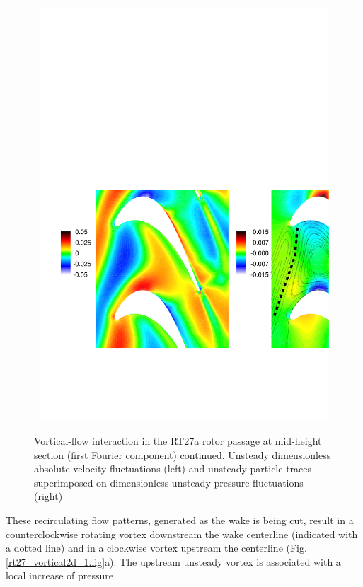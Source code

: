\begin{figure}
\begin{center}
\begin{tabular}{c}
{        \includegraphics[width=130mm,clip=t]{CHAP_RT27/FIGURE/unsmidsec_3.pdf}}
   \end{tabular}
  \end{center}
  \vspace{-8mm}
  \caption{Vortical-flow interaction in the RT27a rotor passage at
           mid-height section (first Fourier component) continued.
           Unsteady dimensionless
           absolute velocity fluctuations (left) and unsteady particle traces
           superimposed on dimensionless unsteady pressure fluctuations (right)}
  \label{rt27_vortical2d_2.fig}
\end{figure}
%
 These recirculating flow patterns, generated as the wake is being cut, result
 in a counterclockwise rotating vortex downstream the wake centerline
 (indicated with a dotted line) and in a clockwise vortex upstream
 the centerline (Fig. \ref{rt27_vortical2d_1.fig}a).
 The upstream unsteady vortex is associated with a local increase of pressure
